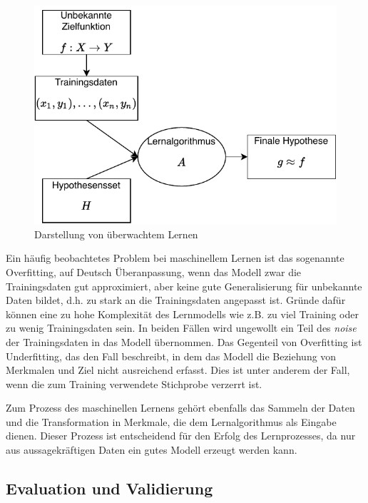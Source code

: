 	\begin{figure}[H]
		\centering
		\includegraphics[scale=1]{pic/SupervisedLearning.pdf}
		\caption[Darstellung von überwachtem Lernen]{Darstellung von überwachtem Lernen}
		\label{fig:supervisedLearning}
	\end{figure}

	
	Ein häufig beobachtetes Problem bei maschinellem Lernen ist das sogenannte Overfitting, auf Deutsch Überanpassung, wenn das Modell zwar die Trainingsdaten gut approximiert, aber keine gute Generalisierung für unbekannte Daten bildet, d.h. zu stark an die Trainingsdaten angepasst ist. Gründe dafür können eine zu hohe Komplexität des Lernmodells wie z.B. zu viel Training oder zu wenig Trainingsdaten sein. %
	In beiden Fällen wird ungewollt ein Teil des \textit{noise} %
	der Trainingsdaten in das Modell übernommen. Das Gegenteil von Overfitting ist Underfitting, das den Fall beschreibt, in dem das Modell die Beziehung von Merkmalen und Ziel nicht ausreichend erfasst. Dies ist unter anderem der Fall, wenn die zum Training verwendete Stichprobe verzerrt ist.
	
	Zum Prozess des maschinellen Lernens gehört ebenfalls das Sammeln der Daten und die Transformation in Merkmale, die dem Lernalgorithmus als Eingabe dienen. Dieser Prozess ist entscheidend für den Erfolg des Lernprozesses, da nur aus aussagekräftigen Daten ein gutes Modell erzeugt werden kann.

	\subsection{Evaluation und Validierung}
	
